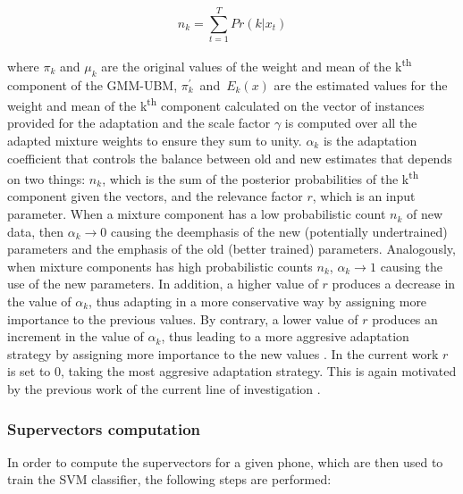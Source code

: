 \begin{equation}
  n_{k} = \sum_{t=1}^{T} Pr(k|x_{t})
\end{equation}

where $\pi_{k}$ and $\mu_{k}$ are the original values of the weight and mean of the
k\textsuperscript{th} component of the GMM-UBM, \mbox{$\pi_{k}^{'}$ and $E_{k}(x)$} are
the estimated values for the weight and mean
of the k\textsuperscript{th} component
calculated on the vector of instances provided
for the adaptation and the scale factor $\gamma$ is computed over all the
adapted mixture weights to ensure they sum to unity.
  $\alpha_{k}$ is the adaptation
  coefficient that controls the balance between old and new estimates that depends on
  two things: $n_{k}$, which is the sum of the posterior probabilities
  of the k\textsuperscript{th} component given the vectors, and
  the relevance factor $r$, which is an input parameter.
  When a mixture component has a low probabilistic count $n_{k}$ of new data, then
  $\alpha_{k} \to 0$ causing the deemphasis of the new (potentially undertrained) parameters
  and the emphasis of the old (better trained) parameters. Analogously,
  when mixture components has
  high probabilistic counts $n_{k}$, $\alpha_{k} \to 1$ causing the use of the new parameters.
  In addition, a higher value of $r$ produces a decrease in the value
  of $\alpha_{k}$, thus adapting in a more conservative way by assigning more importance
  to the previous values. By contrary, a lower value of $r$ produces an increment in the value
  of $\alpha_{k}$, thus leading to a more aggresive adaptation strategy by assigning more importance
  to the new values \cite{ubm_adaptation}.
In the current work $r$ is set to 0, taking the most aggresive
adaptation strategy. This is again motivated by the previous work of the current
line of investigation \cite{main}.

\subsubsection{Supervectors computation} \label{subsubsection:supervectors}

In order to compute the supervectors for a given phone, which are then used to train the SVM
classifier, the following steps are performed:

